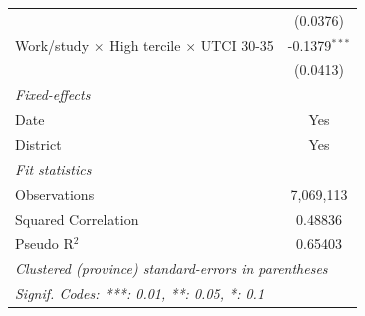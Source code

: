 \begin{table}[htbp]
\begin{tabular}{lc}
                                                                        & (0.0376)\\   
      Work/study $\times$ High tercile $\times$ UTCI 30-35              & -0.1379$^{***}$\\   
                                                                        & (0.0413)\\   
      \midrule
      \emph{Fixed-effects}\\
      Date                                                              & Yes\\  
      District                                                          & Yes\\  
      \midrule
      \emph{Fit statistics}\\
      Observations                                                      & 7,069,113\\  
      Squared Correlation                                               & 0.48836\\  
      Pseudo R$^2$                                                      & 0.65403\\  
      \midrule \midrule
      \multicolumn{2}{l}{\emph{Clustered (province) standard-errors in parentheses}}\\
      \multicolumn{2}{l}{\emph{Signif. Codes: ***: 0.01, **: 0.05, *: 0.1}}\\
   \end{tabular}
\end{table}


